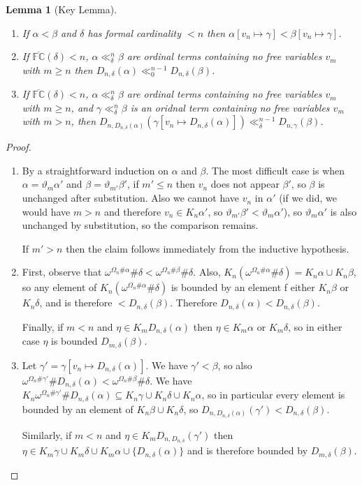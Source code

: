 \documentclass[11pt]{amsart}
\newtheorem{lemma}[theorem]{Lemma}
\theoremstyle{definition}
\begin{document}
\begin{lemma}[Key Lemma]
  \begin{enumerate}
  \item If $\alpha<\beta$ and $\delta$ has formal cardinality $<n$ then $\alpha[v_n\mapsto\gamma]<\beta[v_n\mapsto\gamma]$.
  \item If $\overline{\mathbb{FC}}(\delta)<n$, $\alpha\ll^n_\delta\beta$ are ordinal terms containing no free variables $v_m$ with $m\geq n$ then $D_{n,\delta}(\alpha)\ll^{n-1}_0D_{n,\delta}(\beta)$.
  \item If $\overline{\mathbb{FC}}(\delta)<n$, $\alpha\ll^n_\delta\beta$ are ordinal terms containing no free variables $v_m$ with $m\geq n$, and $\gamma\ll^n_\delta\beta$ is an oridnal term containing no free variables $v_m$ with $m>n$, then $D_{n,D_{n,\delta}(\alpha)}(\gamma[v_n\mapsto D_{n,\delta}(\alpha)])\ll^{n-1}_{\delta}D_{n,\gamma}(\beta)$.
  \end{enumerate}
\end{lemma}
\begin{proof}
  \begin{enumerate}
  \item   By a straightforward induction on $\alpha$ and $\beta$. The most difficult case is when $\alpha=\vartheta_m\alpha'$ and $\beta=\vartheta_{m'}\beta'$, if $m'\leq n$ then $v_n$ does not appear $\beta'$, so $\beta$ is unchanged after substitution. Also we cannot have $v_n$ in $\alpha'$ (if we did, we would have $m>n$ and therefore $v_n\in K_n\alpha'$, so $\vartheta_{m'}\beta'<\vartheta_m\alpha'$), so $\vartheta_m\alpha'$ is also unchanged by substitution, so the comparison remains.

    If $m'>n$ then the claim follows immediately from the inductive hypothesis.
  \item First, observe that $\omega^{\Omega_n\#\alpha}\#\delta<\omega^{\Omega_n\#\beta}\#\delta$. Also, $K_n(\omega^{\Omega_n\#\alpha}\#\delta)=K_n\alpha\cup K_n\beta$, so any element of $K_n(\omega^{\Omega_n\#\alpha}\#\delta)$ is bounded by an element f either $K_n\beta$ or $K_n\delta$, and is therefore $<D_{n,\delta}(\beta)$. Therefore $D_{n,\delta}(\alpha)<D_{n,\delta}(\beta)$.

    Finally, if $m<n$ and $\eta\in K_m D_{n,\delta}(\alpha)$ then $\eta\in K_m\alpha$ or $K_m\delta$, so in either case $\eta$ is bounded $D_{m,\delta}(\beta)$.
  \item Let $\gamma'=\gamma[v_n\mapsto D_{n,\delta}(\alpha)]$. We have $\gamma'<\beta$, so also $\omega^{\Omega_n\#\gamma'}\# D_{n,\delta}(\alpha)<\omega^{\Omega_n\#\beta}\#\delta$. We have $K_n \omega^{\Omega_n\#\gamma'}\# D_{n,\delta}(\alpha)\subseteq K_n\gamma\cup K_n\delta \cup K_n\alpha$, so in particular every element is bounded by an element of $K_n\beta\cup K_n\delta$, so $D_{n,D_{n,\delta}(\alpha)}(\gamma')<D_{n,\delta}(\beta)$.

    Similarly, if $m<n$ and $\eta\in K_m D_{n,D_{n,\delta}}(\gamma')$ then $\eta\in K_m\gamma\cup K_m\delta\cup K_m\alpha\cup\{D_{n,\delta}(\alpha)\}$ and is therefore bounded by $D_{m,\delta}(\beta)$.
  \end{enumerate}
\end{proof}
\end{document}
